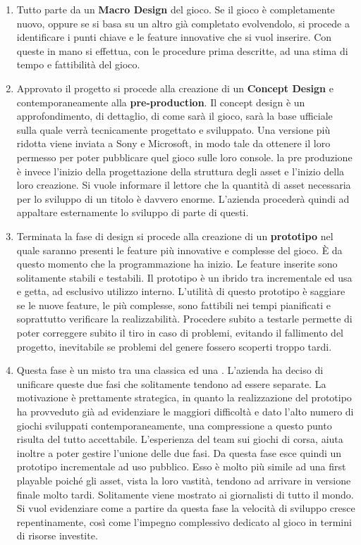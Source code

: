 \begin{enumerate}
	\item Tutto parte da un \textbf{Macro Design} del gioco. Se il gioco è completamente nuovo, oppure se si basa su un altro già completato evolvendolo, si procede a identificare i punti chiave e le feature innovative che si vuol inserire. Con queste in mano si effettua, con le procedure prima descritte, ad una stima di tempo e fattibilità del gioco.
	\item Approvato il progetto si procede alla creazione di un \textbf{Concept Design} e contemporaneamente alla \textbf{pre-production}. Il concept design è un approfondimento, di dettaglio, di come sarà il gioco, sarà la base ufficiale sulla quale verrà tecnicamente progettato e sviluppato. Una versione più ridotta viene inviata a Sony e Microsoft, in modo tale da ottenere il loro permesso per poter pubblicare quel gioco sulle loro console. la pre produzione è invece l'inizio della progettazione della struttura degli asset e l'inizio della loro creazione. Si vuole informare il lettore che la quantità di asset necessaria per lo sviluppo di un titolo  è davvero enorme. L'azienda procederà quindi ad appaltare esternamente lo sviluppo di parte di questi.
	\item Terminata la fase di design si procede alla creazione di un \textbf{prototipo} nel quale saranno presenti le feature più innovative e complesse del gioco. È da questo momento che la programmazione ha inizio. Le feature inserite sono solitamente stabili e testabili. Il prototipo è un ibrido tra incrementale ed usa e getta, ad esclusivo utilizzo interno. L'utilità di questo prototipo è saggiare se le nuove feature, le più complesse, sono fattibili nei tempi pianificati e soprattutto verificare la realizzabilità. Procedere subito a testarle permette di poter correggere subito il tiro in caso di problemi, evitando il fallimento del progetto, inevitabile se problemi del genere fossero scoperti troppo tardi.
	\item Questa fase è un misto tra una classica \textbf{} ed una \textbf{}. L'azienda ha deciso di unificare queste due fasi che solitamente tendono ad essere separate. La motivazione è prettamente strategica, in quanto la realizzazione del prototipo ha provveduto già ad evidenziare le maggiori difficoltà e dato l'alto numero di giochi sviluppati contemporaneamente, una compressione a questo punto risulta del tutto accettabile. L'esperienza del team sui giochi di corsa, aiuta inoltre a poter gestire l'unione delle due fasi. Da questa fase esce quindi un prototipo incrementale ad uso pubblico. Esso è molto più simile ad una first playable poiché gli asset, vista la loro vastità, tendono ad arrivare in versione finale molto tardi. Solitamente viene mostrato ai giornalisti di tutto il mondo. Si vuol evidenziare come a partire da questa fase la velocità di sviluppo cresce repentinamente, così come l'impegno complessivo dedicato al gioco in termini di risorse investite.

\end{enumerate}
